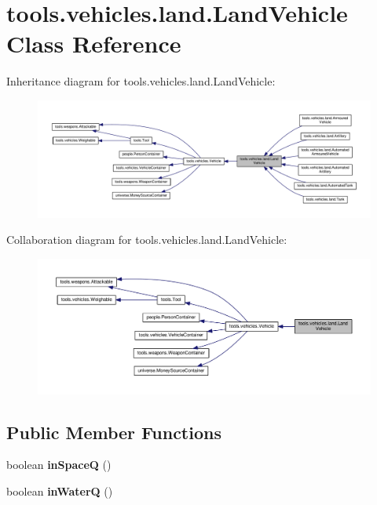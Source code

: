\hypertarget{classtools_1_1vehicles_1_1land_1_1_land_vehicle}{}\section{tools.\+vehicles.\+land.\+Land\+Vehicle Class Reference}
\label{classtools_1_1vehicles_1_1land_1_1_land_vehicle}


Inheritance diagram for tools.\+vehicles.\+land.\+Land\+Vehicle\+:
\nopagebreak
\begin{figure}[H]
\begin{center}
\leavevmode
\includegraphics[width=350pt]{classtools_1_1vehicles_1_1land_1_1_land_vehicle__inherit__graph}
\end{center}
\end{figure}


Collaboration diagram for tools.\+vehicles.\+land.\+Land\+Vehicle\+:
\nopagebreak
\begin{figure}[H]
\begin{center}
\leavevmode
\includegraphics[width=350pt]{classtools_1_1vehicles_1_1land_1_1_land_vehicle__coll__graph}
\end{center}
\end{figure}
\subsection*{Public Member Functions}
\begin{DoxyCompactItemize}
\item 
boolean {\bfseries in\+SpaceQ} ()\hypertarget{classtools_1_1vehicles_1_1land_1_1_land_vehicle_af88d4c2e74c529d1f4aa8dc6eee04066}{}\label{classtools_1_1vehicles_1_1land_1_1_land_vehicle_af88d4c2e74c529d1f4aa8dc6eee04066}

\item 
boolean {\bfseries in\+WaterQ} ()\hypertarget{classtools_1_1vehicles_1_1land_1_1_land_vehicle_ac69257ed9077f5c39bc498d79087de1c}{}\label{classtools_1_1vehicles_1_1land_1_1_land_vehicle_ac69257ed9077f5c39bc498d79087de1c}

\end{DoxyCompactItemize}

